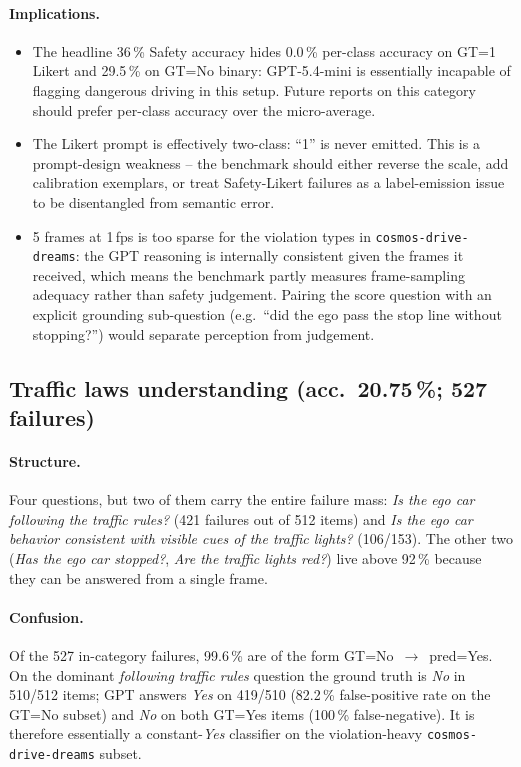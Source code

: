 \documentclass[11pt,a4paper]{article}
\newcommand{\pct}[1]{#1\,\%}
\newcommand{\code}[1]{\texttt{#1}}
\begin{document}
\paragraph{Implications.}
\begin{itemize}
  \item The headline \pct{36} Safety accuracy hides \pct{0.0}
  per-class accuracy on GT=1 Likert and \pct{29.5} on GT=No binary:
  GPT-5.4-mini is essentially incapable of flagging dangerous driving
  in this setup. Future reports on this category should prefer
  per-class accuracy over the micro-average.
  \item The Likert prompt is effectively two-class: ``1'' is never
  emitted. This is a prompt-design weakness -- the benchmark should
  either reverse the scale, add calibration exemplars, or treat
  Safety-Likert failures as a label-emission issue to be disentangled
  from semantic error.
  \item 5 frames at 1\,fps is too sparse for the violation types in
  \code{cosmos-drive-dreams}: the GPT reasoning is internally
  consistent given the frames it received, which means the benchmark
  partly measures frame-sampling adequacy rather than safety
  judgement. Pairing the score question with an explicit grounding
  sub-question (e.g.~``did the ego pass the stop line without
  stopping?'') would separate perception from judgement.
\end{itemize}

\subsection{Traffic laws understanding (acc.~\pct{20.75}; \num{527} failures)}
\label{sec:traffic}

\paragraph{Structure.} Four questions, but two of them carry the
entire failure mass: \emph{Is the ego car following the traffic
rules?} (\num{421} failures out of 512 items) and \emph{Is the ego
car behavior consistent with visible cues of the traffic lights?}
(106/153). The other two (\emph{Has the ego car stopped?},
\emph{Are the traffic lights red?}) live above 92\,\% because they
can be answered from a single frame.

\paragraph{Confusion.} Of the \num{527} in-category failures,
\pct{99.6} are of the form GT=No~$\to$~pred=Yes. On the dominant
\emph{following traffic rules} question the ground truth is
\emph{No} in 510/512 items; GPT answers \emph{Yes} on 419/510
(\pct{82.2} false-positive rate on the GT=No subset) and
\emph{No} on both GT=Yes items (\pct{100} false-negative).
It is therefore essentially a constant-\emph{Yes} classifier on
the violation-heavy \code{cosmos-drive-dreams} subset.
\end{document}

